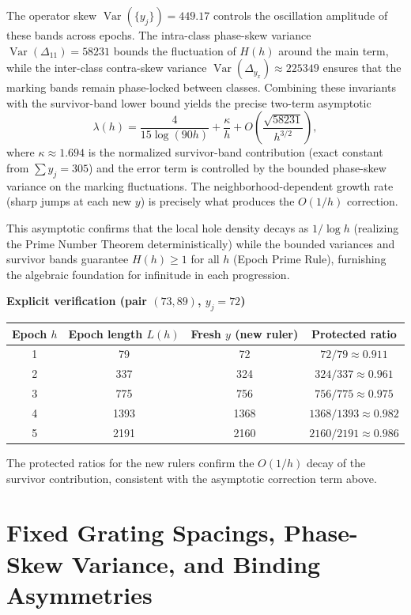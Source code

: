 \documentclass[11pt,a4paper]{article}
\begin{document}
The operator skew \(\operatorname{Var}(\{y_j\})=449.17\) controls the oscillation amplitude of these bands across epochs. The intra-class phase-skew variance \(\operatorname{Var}(\Delta_{11})=58231\) bounds the fluctuation of \(H(h)\) around the main term, while the inter-class contra-skew variance \(\operatorname{Var}(\Delta_{y_x})\approx225349\) ensures that the marking bands remain phase-locked between classes. Combining these invariants with the survivor-band lower bound yields the precise two-term asymptotic
\[
\lambda(h)=\frac{4}{15\log(90h)}+\frac{\kappa}{h}+O\left(\frac{\sqrt{58231}}{h^{3/2}}\right),
\]
where \(\kappa\approx1.694\) is the normalized survivor-band contribution (exact constant from \(\sum y_j=305\)) and the error term is controlled by the bounded phase-skew variance on the marking fluctuations. The neighborhood-dependent growth rate (sharp jumps at each new \(y\)) is precisely what produces the \(O(1/h)\) correction.

This asymptotic confirms that the local hole density decays as \(1/\log h\) (realizing the Prime Number Theorem deterministically) while the bounded variances and survivor bands guarantee \(H(h)\ge1\) for all \(h\) (Epoch Prime Rule), furnishing the algebraic foundation for infinitude in each progression.

\textbf{Explicit verification (pair \((73,89)\), \(y_j=72\))}\\
\begin{center}
\begin{tabular}{c|c|c|c}
Epoch \(h\) & Epoch length \(L(h)\) & Fresh \(y\) (new ruler) & Protected ratio \\
\hline
1 & 79 & 72 & \(72/79\approx0.911\) \\
2 & 337 & 324 & \(324/337\approx0.961\) \\
3 & 775 & 756 & \(756/775\approx0.975\) \\
4 & 1393 & 1368 & \(1368/1393\approx0.982\) \\
5 & 2191 & 2160 & \(2160/2191\approx0.986\)
\end{tabular}
\end{center}
The protected ratios for the new rulers confirm the \(O(1/h)\) decay of the survivor contribution, consistent with the asymptotic correction term above.


\section{Fixed Grating Spacings, Phase-Skew Variance, and Binding Asymmetries}
\end{document}

